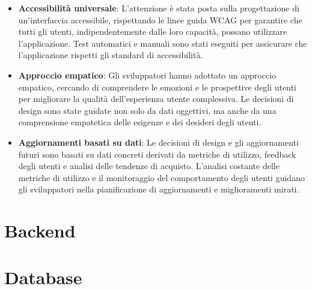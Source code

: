 \begin{itemize}
    \item \textbf{Accessibilità universale}: L'attenzione è stata posta sulla progettazione di un'interfaccia accessibile, rispettando le linee guida WCAG per garantire che tutti gli utenti, indipendentemente dalle loro capacità, possano utilizzare l'applicazione. Test automatici e manuali sono stati eseguiti per assicurare che l'applicazione rispetti gli standard di accessibilità.
    \item \textbf{Approccio empatico}: Gli sviluppatori hanno adottato un approccio empatico, cercando di comprendere le emozioni e le prospettive degli utenti per migliorare la qualità dell'esperienza utente complessiva. Le decisioni di design sono state guidate non solo da dati oggettivi, ma anche da una comprensione empatetica delle esigenze e dei desideri degli utenti.
    \item \textbf{Aggiornamenti basati su dati}: Le decisioni di design e gli aggiornamenti futuri sono basati su dati concreti derivati da metriche di utilizzo, feedback degli utenti e analisi delle tendenze di acquisto. L'analisi costante delle metriche di utilizzo e il monitoraggio del comportamento degli utenti guidano gli sviluppatori nella pianificazione di aggiornamenti e miglioramenti mirati.
\end{itemize}

\section{Backend}

\section{Database}
